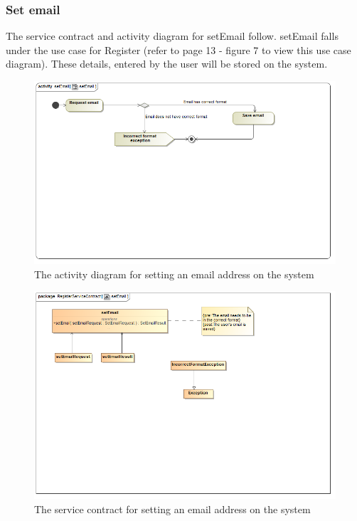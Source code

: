 \documentclass[a4paper,12pt]{report}
\begin{document}
\subsubsection{Set email}
The service contract and activity diagram for setEmail follow. setEmail falls under the use case for Register (refer to page 13  - figure 7 to view this use case diagram). These details, entered by the user will be stored on the system.
\begin{figure}[H]
  \centering
    \includegraphics[width=1.0\textwidth]{../Diagrams/Register/ActivityDiagrams/setEmail1.png}
    \caption{The activity diagram for setting an email address on the system} 
\end{figure}
\begin{figure}[H]
  \centering
    \includegraphics[width=1.0\textwidth]{../Diagrams/Register/ServiceContractsRegister/setEmailServiceContract.png}
    \caption{The service contract for setting an email address on the system} 
\end{figure}
\end{document}

